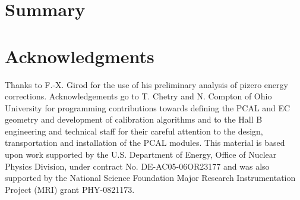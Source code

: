 \section{Summary}
 


\section*{Acknowledgments}

Thanks to F.-X. Girod for the use of his preliminary analysis of pizero energy corrections.  Acknowledgements go to T. Chetry and N. Compton of Ohio University for programming contributions towards defining the PCAL and EC geometry and development of  calibration algorithms and to the Hall B engineering and technical staff for their careful attention to the design, transportation and installation of the PCAL modules.
This material is based upon work supported by the U.S. Department of Energy, Office of Nuclear Physics Division, under contract No. DE-AC05-06OR23177 and was also supported by the National Science Foundation Major Research Instrumentation Project (MRI) grant PHY-0821173.





